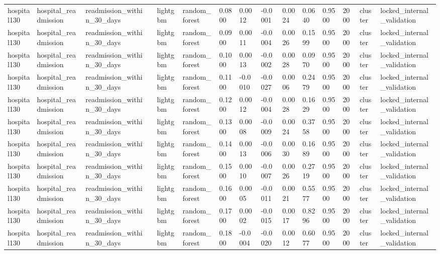 \begin{tabular}{lllllllllllllll}
hospital130 & hospital\_readmission & readmission\_within\_30\_days &  & lightgbm & random\_forest & 0.0800 & 0.0012 & -0.0001 & 0.0024 & 0.0640 & 0.9500 & 2000 & cluster & locked\_internal\_validation \\
hospital130 & hospital\_readmission & readmission\_within\_30\_days &  & lightgbm & random\_forest & 0.0900 & 0.0011 & -0.0004 & 0.0026 & 0.1599 & 0.9500 & 2000 & cluster & locked\_internal\_validation \\
hospital130 & hospital\_readmission & readmission\_within\_30\_days &  & lightgbm & random\_forest & 0.1000 & 0.0013 & -0.0002 & 0.0028 & 0.0970 & 0.9500 & 2000 & cluster & locked\_internal\_validation \\
hospital130 & hospital\_readmission & readmission\_within\_30\_days &  & lightgbm & random\_forest & 0.1100 & -0.0010 & -0.0027 & 0.0006 & 0.2479 & 0.9500 & 2000 & cluster & locked\_internal\_validation \\
hospital130 & hospital\_readmission & readmission\_within\_30\_days &  & lightgbm & random\_forest & 0.1200 & 0.0012 & -0.0004 & 0.0028 & 0.1629 & 0.9500 & 2000 & cluster & locked\_internal\_validation \\
hospital130 & hospital\_readmission & readmission\_within\_30\_days &  & lightgbm & random\_forest & 0.1300 & 0.0008 & -0.0009 & 0.0024 & 0.3758 & 0.9500 & 2000 & cluster & locked\_internal\_validation \\
hospital130 & hospital\_readmission & readmission\_within\_30\_days &  & lightgbm & random\_forest & 0.1400 & 0.0013 & -0.0006 & 0.0030 & 0.1689 & 0.9500 & 2000 & cluster & locked\_internal\_validation \\
hospital130 & hospital\_readmission & readmission\_within\_30\_days &  & lightgbm & random\_forest & 0.1500 & 0.0010 & -0.0007 & 0.0026 & 0.2719 & 0.9500 & 2000 & cluster & locked\_internal\_validation \\
hospital130 & hospital\_readmission & readmission\_within\_30\_days &  & lightgbm & random\_forest & 0.1600 & 0.0005 & -0.0011 & 0.0021 & 0.5577 & 0.9500 & 2000 & cluster & locked\_internal\_validation \\
hospital130 & hospital\_readmission & readmission\_within\_30\_days &  & lightgbm & random\_forest & 0.1700 & 0.0002 & -0.0015 & 0.0017 & 0.8296 & 0.9500 & 2000 & cluster & locked\_internal\_validation \\
hospital130 & hospital\_readmission & readmission\_within\_30\_days &  & lightgbm & random\_forest & 0.1800 & -0.0004 & -0.0020 & 0.0012 & 0.6077 & 0.9500 & 2000 & cluster & locked\_internal\_validation \\

\end{tabular}
